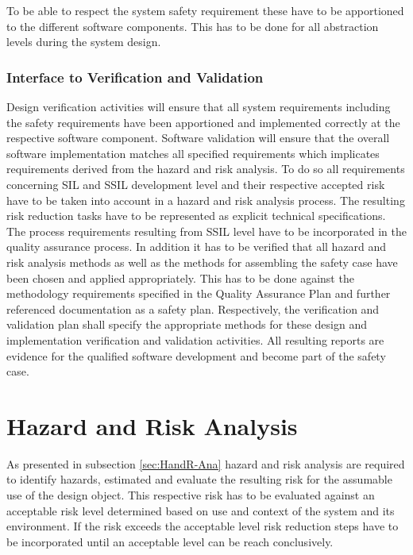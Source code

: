 \documentclass{template/openetcs_report}
\begin{document}
To be able to respect the system safety requirement these have to be apportioned to the different software components. This has to be done for all abstraction levels during the system design. 

\subsection{Interface to Verification and Validation}

Design verification activities will ensure that all system requirements including the safety requirements have been apportioned and implemented correctly at the respective software component. Software validation will ensure that the overall software implementation matches all specified requirements which implicates requirements derived from the hazard and risk analysis. To do so all requirements concerning SIL and SSIL development level and their respective accepted risk have to be taken into account in a hazard and risk analysis process. The resulting risk reduction tasks have to be represented as explicit technical specifications. The process requirements resulting from SSIL level have to be incorporated in the quality assurance process. In addition it has to be verified that all hazard and risk analysis methods as well as the methods for assembling the safety case have been chosen and applied appropriately. This has to be done against the methodology requirements specified in the Quality Assurance Plan and further referenced documentation as a safety plan.
Respectively, the verification and validation plan shall specify the appropriate methods for these design and implementation verification and validation activities. All resulting reports are evidence for the qualified software development and become part of the safety case.



\chapter{Hazard and Risk Analysis}
\label{sec:hazardandrisk}

As presented in subsection \ref{sec:HandR-Ana} hazard and risk analysis are required to identify hazards, estimated and evaluate the resulting risk for the assumable use of the design object. This respective risk has to be evaluated against an acceptable risk level determined based on use and context of the system and its environment. If the risk exceeds the acceptable level risk reduction steps have to be incorporated until an acceptable level can be reach conclusively. 
\end{document}
